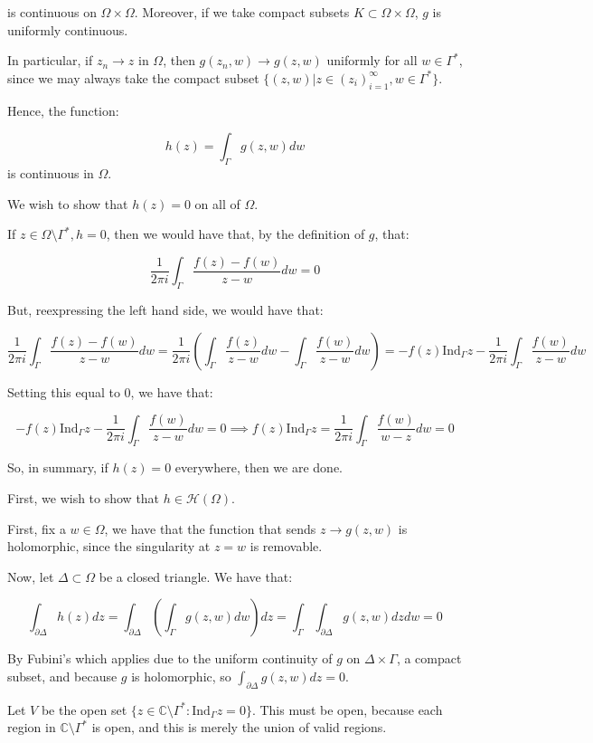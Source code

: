 \documentclass[10pt]{article}
\newcommand{\calH}{\mathcal{H}}
\newcommand{\ind}{\text{Ind}}
\begin{document}
is continuous on $\Omega \times \Omega$. Moreover, if we take compact subsets $K \subset \Omega \times \Omega$, $g$ is uniformly continuous. 

In particular, if $z_n \to z$ in $\Omega$, then $g(z_n,w) \to g(z,w)$ uniformly for all $w \in \Gamma^*$, since we may always take the compact subset $\{ (z,w) | z \in (z_i)_{i=1}^\infty, w \in \Gamma^* \}$.

Hence, the function:

$$ h(z) = \int_\Gamma g(z,w) dw$$ is continuous in $\Omega$. 

We wish to show that $h(z) = 0$ on all of $\Omega$. 

If $z \in \Omega \setminus \Gamma^*, h = 0$, then we would have that, by the definition of $g$, that:

$$ \frac{1}{2\pi i} \int_\Gamma \frac{f(z) - f(w)}{z - w} dw = 0$$

But, reexpressing the left hand side, we would have that:

$$\frac{1}{2\pi i} \int_\Gamma \frac{f(z) - f(w)}{z - w} dw = \frac{1}{2\pi i} \left(\int_\Gamma \frac{f(z)}{z - w} dw - \int_\Gamma \frac{f(w)}{z - w} dw\right) = - f(z) \ind_\Gamma z - \frac{1}{2\pi i} \int_\Gamma \frac{f(w)}{z - w} dw $$

Setting this equal to 0, we have that:

$$- f(z) \ind_\Gamma z - \frac{1}{2\pi i} \int_\Gamma \frac{f(w)}{z - w} dw = 0 \implies f(z) \ind_\Gamma z = \frac{1}{2\pi i} \int_\Gamma \frac{f(w)}{w - z} dw = 0$$

So, in summary, if $h(z) = 0$ everywhere, then we are done.

First, we wish to show that $h \in \calH(\Omega)$.

First, fix a $w \in \Omega$, we have that the function that sends $z \to g(z,w)$ is holomorphic, since the singularity at $z = w$ is removable. 

Now, let $\Delta \subset \Omega$ be a closed triangle. We have that:

$$ \int_{\partial \Delta} h(z) dz = \int_{\partial \Delta} \left( \int_\Gamma g(z,w) dw \right)dz  = \int_\Gamma \int_{\partial \Delta} g(z,w) dz dw = 0 $$

By Fubini’s which applies due to the uniform continuity of $g$ on $\Delta \times \Gamma$, a compact subset, and because $g$ is holomorphic, so $ \int_{\partial \Delta} g(z,w) dz = 0$.

Let $V$ be the open set $\{ z \in \mathbb{C} \setminus \Gamma^* : \ind_\Gamma z = 0 \}$. This must be open, because each region in $\mathbb{C} \setminus \Gamma ^*$ is open, and this is merely the union of valid regions. 
\end{document}
